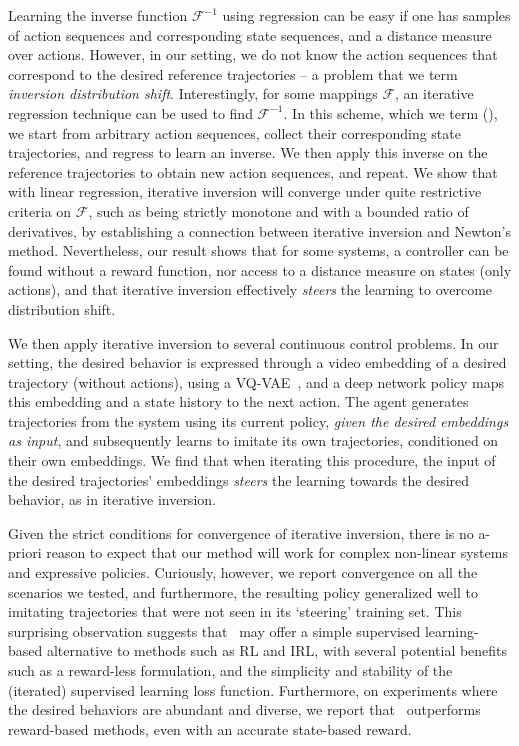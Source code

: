 \documentclass[nohyperref]{article}
\begin{document}
Learning the inverse function $\mathcal{F}^{-1}$ using regression can be easy if one has samples of action sequences and corresponding state sequences, and a distance measure over actions. However, in our setting, we do not know the action sequences that correspond to the desired reference trajectories -- a problem that we term \textit{inversion distribution shift}. Interestingly, for some mappings $\mathcal{F}$, an iterative regression technique can be used to find $\mathcal{F}^{-1}$. In this scheme, which we term \textit{\methodnamefull} (\methodname), we start from arbitrary action sequences, collect their corresponding state trajectories, and regress to learn an inverse. We then apply this inverse on the reference trajectories to obtain new action sequences, and repeat. We show that with linear regression, iterative inversion will converge under quite restrictive criteria on $\mathcal{F}$, such as being strictly monotone and with a bounded ratio of derivatives, by establishing a connection between iterative inversion and Newton's method.
Nevertheless, our result shows that for some systems, a controller can be found without a reward function, nor access to a distance measure on states (only actions), and that iterative inversion effectively \textit{steers} the learning to overcome distribution shift.

We then apply iterative inversion to several continuous control problems. In our setting, the desired behavior is expressed through a video embedding of a desired trajectory (without actions), using a VQ-VAE~\citep{van2017neural}, and a deep network policy maps this embedding and a state history to the next action.
The agent generates trajectories from the system using its current policy, \textit{given the desired embeddings as input}, and subsequently learns to imitate its own trajectories, conditioned on their own embeddings. We find that when iterating this procedure, 
the input of the desired trajectories' embeddings
\textit{steers} the learning towards the desired behavior, as in iterative inversion.

Given the strict conditions for convergence of iterative inversion, there is no a-priori reason to expect that our method will work for complex non-linear systems and expressive policies. Curiously, however, we report convergence on all the scenarios we tested, and furthermore, the resulting policy generalized well to imitating trajectories that were not seen in its `steering' training set. 
This surprising observation suggests that \methodname\
may offer a simple supervised learning-based alternative to methods such as RL and IRL, with several potential benefits such as a reward-less formulation, and the simplicity and stability of the (iterated) supervised learning loss function. Furthermore, on experiments where the desired behaviors are abundant and diverse, we report that \methodname\ outperforms reward-based methods, even with an accurate state-based reward.
\end{document}
